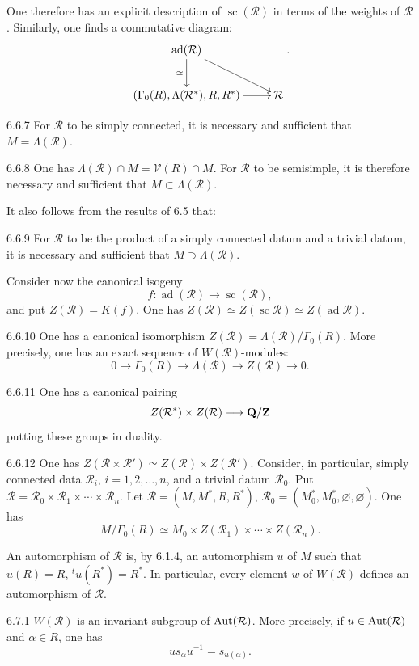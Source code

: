One therefore has an explicit description of $\operatorname{sc}(\mathcal R)$ in terms of the weights of $\mathcal R$. Similarly, one finds a commutative diagram:
\[
\xymatrix{\operatorname{ad}(\mathcal R)\ar[d]_{\simeq}\ar[dr]&\\
(\Gamma_0(R),\Lambda(\mathcal R^*),R,R^*)\ar[r]&\mathcal R}.
\]
\begin{corollary}{6.6.7}\label{XXI.6.6.7}
For $\mathcal R$ to be simply connected, it is necessary and sufficient that $M=\Lambda(\mathcal R)$.
\end{corollary}
\begin{remark}{6.6.8}\label{XXI.6.6.8}
One has $\Lambda(\mathcal R)\cap M=\mathcal V(R)\cap M$. For $\mathcal R$ to be semisimple, it is therefore necessary and sufficient that $M\subset\Lambda(\mathcal R)$.
\end{remark}
It also follows from the results of 6.5 that:
\begin{corollary}{6.6.9}\label{XXI.6.6.9}
For $\mathcal R$ to be the product of a simply connected datum and a trivial datum, it is necessary and sufficient that $M\supset\Lambda(\mathcal R)$.
\end{corollary}
Consider now the canonical isogeny
\[
f:\operatorname{ad}(\mathcal R)\to\operatorname{sc}(\mathcal R),
\]
and put $Z(\mathcal R)=K(f)$. One has $Z(\mathcal R)\simeq Z(\operatorname{sc}\mathcal R)\simeq Z(\operatorname{ad}\mathcal R)$.
\begin{corollary}{6.6.10}\label{XXI.6.6.10}
One has a canonical isomorphism $Z(\mathcal R)=\Lambda(\mathcal R)/\Gamma_0(R)$. More precisely, one has an exact sequence of $W(\mathcal R)$-modules:
\[
0\to\Gamma_0(R)\to\Lambda(\mathcal R)\to Z(\mathcal R)\to0.
\]
\end{corollary}
\begin{corollary}{6.6.11}\label{XXI.6.6.11}
One has a canonical pairing
\[
Z(\mathcal R^*)\times Z(\mathcal R)\longrightarrow\mathbf{Q}/\mathbf{Z}
\]
putting these groups in duality.
\end{corollary}
\begin{remark}{6.6.12}\label{XXI.6.6.12}
One has $Z(\mathcal R\times\mathcal R')\simeq Z(\mathcal R)\times Z(\mathcal R')$. Consider, in particular, simply connected data $\mathcal R_i$, $i=1,2,\ldots,n$, and a trivial datum $\mathcal R_0$. Put $\mathcal R=\mathcal R_0\times\mathcal R_1\times\cdots\times\mathcal R_n$. Let $\mathcal R=(M,M^*,R,R^*)$, $\mathcal R_0=(M_0^*,M_0^*,\varnothing,\varnothing)$. One has
\[
M/\Gamma_0(R)\simeq M_0\times Z(\mathcal R_1)\times\cdots\times Z(\mathcal R_n).
\]
\end{remark}

An automorphism of $\mathcal R$ is, by 6.1.4, an automorphism $u$ of $M$ such that $u(R)=R$, ${}^tu(R^*)=R^*$. In particular, every element $w$ of $W(\mathcal R)$ defines an automorphism of $\mathcal R$.
\begin{lemma}{6.7.1}\label{XXI.6.7.1}
$W(\mathcal R)$ is an invariant subgroup of $\operatorname{Aut}(\mathcal R)$. More precisely, if $u\in\operatorname{Aut}(\mathcal R)$ and $\alpha\in R$, one has
\[
us_\alpha u^{-1}=s_{u(\alpha)}.
\]
\end{lemma}
